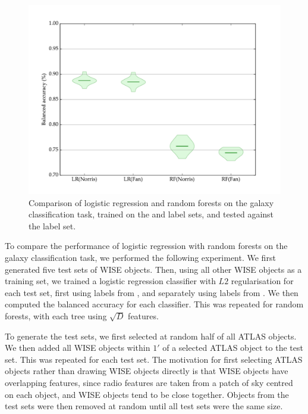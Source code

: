   \begin{figure}
    \centering
    \includegraphics[width=\textwidth]{images/experiments/lr_rf}
    \caption{Comparison of logistic regression and random forests on the galaxy
      classification task, trained on the \citet{norris06} and \citet{fan15}
      label sets, and tested against the \citet{norris06} label set.}
  \end{figure}

  To compare the performance of logistic regression with random forests on the
  galaxy classification task, we performed the following experiment. We first
  generated five test sets of WISE objects. Then, using all other WISE objects
  as a training set, we trained a logistic regression classifier with $L2$
  regularisation for each test set, first using labels from \citet{norris06},
  and separately using labels from \citet{fan15}. We then computed the balanced
  accuracy for each classifier. This was repeated for random forests, with each
  tree using $\sqrt{D}$ features.

  To generate the test sets, we first selected at random half of all ATLAS
  objects. We then added all WISE objects within $1'$ of a selected ATLAS object
  to the test set. This was repeated for each test set. The motivation for first
  selecting ATLAS objects rather than drawing WISE objects directly is that WISE
  objects have overlapping features, since radio features are taken from a patch
  of sky centred on each object, and WISE objects tend to be close together.
  Objects from the test sets were then removed at random until all test sets
  were the same size.

